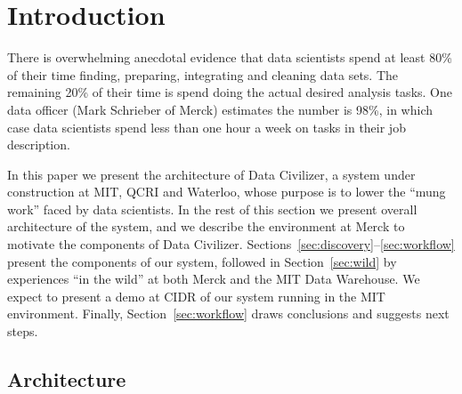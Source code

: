 \section{Introduction}
\label{introduction}

There is overwhelming anecdotal evidence that data scientists spend at least 80\%
of their time finding, preparing, integrating and cleaning data sets.
The remaining 20\% of their time is spend doing the actual desired 
analysis tasks.
One data officer (Mark Schrieber of
Merck) estimates the number is 98\%, in which case data scientists spend less
than one hour a week on tasks in their job description.

In this paper we present the architecture of Data Civilizer, a system under
construction at MIT, QCRI and Waterloo, whose purpose is to lower the ``mung work'' 
faced by data scientists.  In the rest of this section we present overall architecture of the \dcv system, and we describe the
environment at Merck to motivate the components of Data Civilizer.  
Sections~\ref{sec:discovery}--\ref{sec:workflow} present the
components of our system, followed in Section~\ref{sec:wild} by experiences ``in the wild'' at
both Merck and the MIT Data Warehouse.  We expect to present a demo at CIDR
of our system running in the MIT environment.  Finally, Section~\ref{sec:workflow} draws
conclusions and suggests next steps.

\subsection{Architecture}

